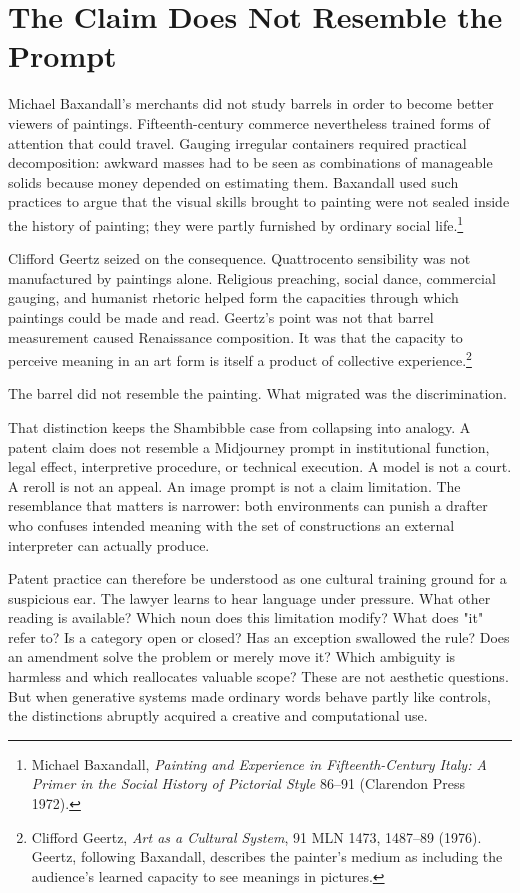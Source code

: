 \documentclass[11pt]{article}
\begin{document}
\section{The Claim Does Not Resemble the Prompt}

Michael Baxandall's merchants did not study barrels in order to become better viewers of paintings. Fifteenth-century commerce nevertheless trained forms of attention that could travel. Gauging irregular containers required practical decomposition: awkward masses had to be seen as combinations of manageable solids because money depended on estimating them. Baxandall used such practices to argue that the visual skills brought to painting were not sealed inside the history of painting; they were partly furnished by ordinary social life.\footnote{Michael Baxandall, \textit{Painting and Experience in Fifteenth-Century Italy: A Primer in the Social History of Pictorial Style} 86--91 (Clarendon Press 1972).}

Clifford Geertz seized on the consequence. Quattrocento sensibility was not manufactured by paintings alone. Religious preaching, social dance, commercial gauging, and humanist rhetoric helped form the capacities through which paintings could be made and read. Geertz's point was not that barrel measurement caused Renaissance composition. It was that the capacity to perceive meaning in an art form is itself a product of collective experience.\footnote{Clifford Geertz, \textit{Art as a Cultural System}, 91 MLN 1473, 1487--89 (1976). Geertz, following Baxandall, describes the painter's medium as including the audience's learned capacity to see meanings in pictures.}

The barrel did not resemble the painting. What migrated was the discrimination.

That distinction keeps the Shambibble case from collapsing into analogy. A patent claim does not resemble a Midjourney prompt in institutional function, legal effect, interpretive procedure, or technical execution. A model is not a court. A reroll is not an appeal. An image prompt is not a claim limitation. The resemblance that matters is narrower: both environments can punish a drafter who confuses intended meaning with the set of constructions an external interpreter can actually produce.

Patent practice can therefore be understood as one cultural training ground for a suspicious ear. The lawyer learns to hear language under pressure. What other reading is available? Which noun does this limitation modify? What does "it" refer to? Is a category open or closed? Has an exception swallowed the rule? Does an amendment solve the problem or merely move it? Which ambiguity is harmless and which reallocates valuable scope? These are not aesthetic questions. But when generative systems made ordinary words behave partly like controls, the distinctions abruptly acquired a creative and computational use.
\end{document}
